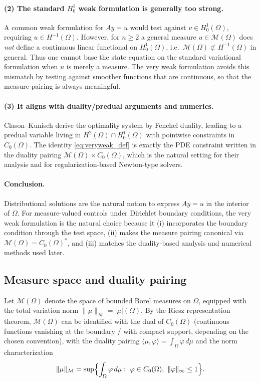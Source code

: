 \documentclass[11pt,a4paper]{article}
\begin{document}
\paragraph{(2) The standard $H^1_0$ weak formulation is generally too strong.}
A common weak formulation for $Ay=u$ would test against $v\in H^1_0(\Omega)$, requiring $u\in H^{-1}(\Omega)$.
However, for $n\ge 2$ a general measure $u\in\mathcal{M}(\Omega)$ does \emph{not} define a continuous linear
functional on $H^1_0(\Omega)$, i.e.\ $\mathcal{M}(\Omega)\not\subset H^{-1}(\Omega)$ in general.
Thus one cannot base the state equation on the standard variational formulation when $u$ is merely a measure.
The very weak formulation avoids this mismatch by testing against smoother functions that are continuous,
so that the measure pairing is always meaningful. \cite{ponceEMS}

\paragraph{(3) It aligns with duality/predual arguments and numerics.}
Clason--Kunisch derive the optimality system by Fenchel duality, leading to a predual variable living in
$H^2(\Omega)\cap H^1_0(\Omega)$ with pointwise constraints in $C_0(\Omega)$.
The identity \eqref{eq:veryweak_def} is exactly the PDE constraint written in the duality pairing
$\mathcal{M}(\Omega)\times C_0(\Omega)$, which is the natural setting for their analysis and for
regularization-based Newton-type solvers. \cite{ClasonKunisch2009}

\paragraph{Conclusion.}
Distributional solutions are the natural notion to express $Ay=u$ in the interior of $\Omega$.
For measure-valued controls under Dirichlet boundary conditions, the very weak formulation is the natural
choice because it (i) incorporates the boundary condition through the test space,
(ii) makes the measure pairing canonical via $\mathcal{M}(\Omega)=C_0(\Omega)^*$, and
(iii) matches the duality-based analysis and numerical methods used later.


\subsection{Measure space and duality pairing}
Let $\mathcal{M}(\Omega)$ denote the space of bounded Borel measures on $\Omega$,
equipped with the total variation norm $\|\mu\|_{\mathcal{M}}=|\mu|(\Omega)$.
By the Riesz representation theorem, $\mathcal{M}(\Omega)$ can be identified with
the dual of $C_0(\Omega)$ (continuous functions vanishing at the boundary / with
compact support, depending on the chosen convention), with the duality pairing
$\langle \mu,\varphi\rangle = \int_\Omega \varphi\,d\mu$ and the norm characterization
\[
\|\mu\|_{\mathcal{M}}=\sup\Bigl\{\int_\Omega \varphi\,d\mu:\ \varphi\in C_0(\Omega),\ \|\varphi\|_\infty\le 1\Bigr\}.
\]
\end{document}
